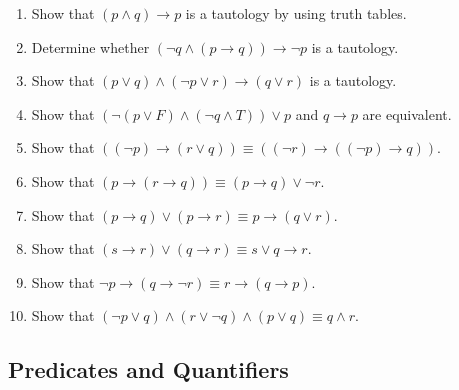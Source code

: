 \documentclass{sig-alternate-05-2015}
\begin{document}
\begin{enumerate}
\item Show that $(p \wedge q) \rightarrow p$ is a tautology
by using truth tables.

\item Determine whether $(\neg q \wedge (p \rightarrow q)) \rightarrow \neg p$ is a tautology.

\item Show that $(p \vee q) \wedge (\neg p \vee r) \rightarrow (q \vee r)$ is a tautology.

\item Show that $(\neg(p \vee F) \wedge (\neg q \wedge T)) \vee p$ and $q\rightarrow p$ are equivalent.

\item Show that $((\neg p) \rightarrow (r\vee q)) \equiv ((\neg r)\rightarrow ((\neg p)\rightarrow q))$.

\item Show that $(p \rightarrow (r \rightarrow q))\equiv (p \rightarrow q)\vee \neg r$.

\item Show that $(p \rightarrow q) \vee (p \rightarrow r) \equiv p \rightarrow (q\vee r)$.

\item Show that $(s \rightarrow r) \vee (q \rightarrow r) \equiv s\vee q \rightarrow  r$.

\item Show that $\neg p \rightarrow (q \rightarrow \neg r)\equiv r \rightarrow (q \rightarrow p)$.

\item Show that $(\neg p \vee q) \wedge (r \vee \neg q) \wedge (p \vee q) \equiv q\wedge r$.
\end{enumerate}

\subsection{Predicates and Quantifiers}
\end{document}
